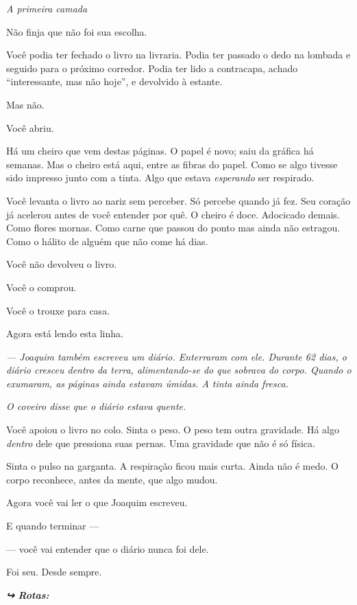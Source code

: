 
\noindent \textit{A primeira camada}

\noindent Não finja que não foi sua escolha.

\noindent Você podia ter fechado o livro na livraria. Podia ter passado o dedo na lombada e seguido para o próximo corredor. Podia ter lido a contracapa, achado \textquotedblleft{}interessante, mas não hoje\textquotedblright{}, e devolvido à estante.

\noindent Mas não.

\noindent Você abriu.

\noindent Há um cheiro que vem destas páginas. O papel é novo; saiu da gráfica há semanas. Mas o cheiro está aqui, entre as fibras do papel. Como se algo tivesse sido impresso junto com a tinta. Algo que estava \textit{esperando} ser respirado.

\noindent Você levanta o livro ao nariz sem perceber. Só percebe quando já fez. Seu coração já acelerou antes de você entender por quê. O cheiro é doce. Adocicado demais. Como flores mornas. Como carne que passou do ponto mas ainda não estragou. Como o hálito de alguém que não come há dias.

\noindent Você não devolveu o livro.

\noindent Você o comprou.

\noindent Você o trouxe para casa.

\noindent Agora está lendo esta linha.

\noindent \textit{--- Joaquim também escreveu um diário. Enterraram com ele. Durante 62 dias, o diário cresceu dentro da terra, alimentando-se do que sobrava do corpo. Quando o exumaram, as páginas ainda estavam úmidas. A tinta ainda fresca.}

\noindent \textit{O coveiro disse que o diário estava quente.}

\noindent Você apoiou o livro no colo. Sinta o peso. O peso tem outra gravidade. Há algo \textit{dentro} dele que pressiona suas pernas. Uma gravidade que não é só física.

\noindent Sinta o pulso na garganta. A respiração ficou mais curta. Ainda não é medo. O corpo reconhece, antes da mente, que algo mudou.

\noindent Agora você vai ler o que Joaquim escreveu.

\noindent E quando terminar ---

\noindent --- você vai entender que o diário nunca foi dele.

\noindent Foi seu. Desde sempre.

\vspace{0.5em}
\noindent\textit{\textbf{↪ Rotas:}  \rotasep {} \rotasep {}}